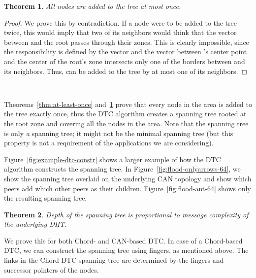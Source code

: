 \documentclass[fleqn,12pt,twoside]{article}
\newtheorem{theorem}{Theorem}
\begin{document}
\begin{theorem}
  \label{thm:at-most-once}
  All nodes are added to the tree at most once.
\end{theorem}
\begin{proof}
  We prove this by contradiction. If a node  were to be added to
  the tree twice, this would imply that two of its neighbors would
  think that the vector between  and the root passes through their
  zones. This is clearly impossible, since the responsibility is
  defined by the vector and the vector between 's center point and
  the center of the root's zone intersects only one of the borders
  between  and its neighbors. Thus,  can be added to the tree by
  at most one of its neighbors.
\end{proof}

\begin{figure*}[!tb]
  \centering
  \mbox{
    \quad
    }
  \caption{Example of DTC-constructed tree}
  \label{fig:example-dtc-constr}
  \vskip -5mm
\end{figure*}



Theorems~\ref{thm:at-least-once} and~\ref{thm:at-most-once} prove that
every node in the area is added to the tree exactly once, thus the DTC
algorithm creates a spanning tree rooted at the root zone and covering
all the nodes in the area. Note that the spanning tree is only
\emph{a} spanning tree; it might not be the minimal spanning tree (but
this property is not a requirement of the applications we are considering).


Figure~\ref{fig:example-dtc-constr} shows a larger example of how the
DTC algorithm constructs the spanning tree. In
Figure~\ref{fig:flood-onlyarrows-64}, we show the spanning tree
overlaid on the underlying CAN topology and show which peers add which
other peers as their children. Figure~\ref{fig:flood-ant-64} shows only the
resulting spanning tree.


\begin{theorem}
  Depth of the spanning tree is proportional to message complexity of
  the underlying DHT.
\end{theorem}

We prove this for both Chord- and CAN-based DTC.  In case of a
Chord-based DTC, we can construct the spanning tree using fingers, as
mentioned above. The links in the Chord-DTC spanning tree are
determined by the fingers and successor pointers of the nodes.
\end{document}

